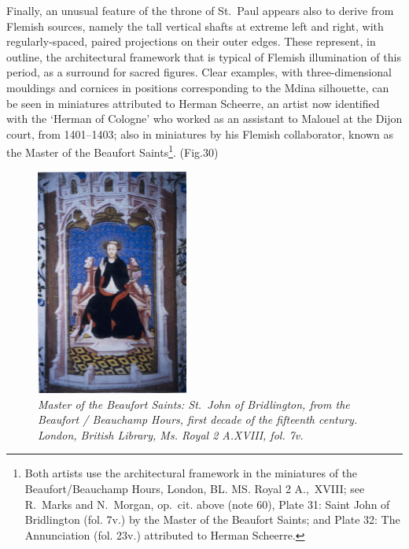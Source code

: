 \documentclass[a4paper,12pt]{article}
\begin{document}
Finally, an unusual feature of the throne of St.~Paul appears also to
derive from Flemish sources, namely the tall vertical shafts at
extreme left and right, with regularly-spaced, paired projections on
their outer edges. These represent, in outline, the architectural
framework that is typical of Flemish illumination of this period, as a
surround for sacred figures. Clear examples, with three-dimensional
mouldings and cornices in positions corresponding to the Mdina
silhouette, can be seen in miniatures attributed to Herman Scheerre,
an artist now identified with the `Herman of Cologne' who worked as an
assistant to Malouel at the Dijon court, from 1401--1403; also in
miniatures by his Flemish collaborator, known as the Master of the
Beaufort Saints\footnote{Both artists use the architectural framework
in the miniatures of the Beaufort/Beauchamp Hours, London,
BL. MS. Royal 2 A.,~XVIII; see R.~Marks and N.~Morgan, op.~cit. above
(note 60), Plate 31: Saint John of Bridlington (fol. 7v.) by the
Master of the Beaufort Saints; and Plate 32: The Annunciation
(fol. 23v.) attributed to Herman Scheerre.}. (Fig.30)
\begin{figure}[htbp]
\centering
\includegraphics[width=5cm]{pics/fig30.png}
\caption[Master of the Beaufort Saints: St.~John of Bridlington] 
{\it Master of the Beaufort Saints: St.~John of Bridlington, from the
Beaufort / Beauchamp Hours, first decade of the fifteenth century.
London, British Library, Ms. Royal 2 A.XVIII, fol. 7v.}
\end{figure}
\end{document}
